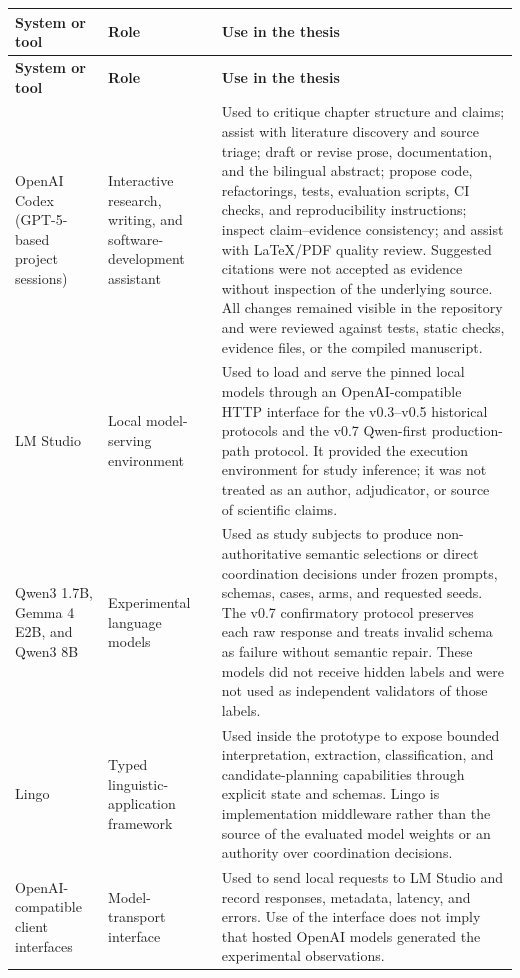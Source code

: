 \begingroup
\setlength{\tabcolsep}{4pt}
\begin{longtable}{>{\raggedright\arraybackslash}p{}>{\raggedright\arraybackslash}p{}>{\raggedright\arraybackslash}p{}}
\toprule
\textbf{System or tool} & \textbf{Role} & \textbf{Use in the thesis} \\
\midrule
\endfirsthead
\toprule
\textbf{System or tool} & \textbf{Role} & \textbf{Use in the thesis} \\
\midrule
\endhead
OpenAI Codex (GPT-5-based project sessions) & Interactive research, writing, and software-development assistant & Used to critique chapter structure and claims; assist with literature discovery and source triage; draft or revise prose, documentation, and the bilingual abstract; propose code, refactorings, tests, evaluation scripts, CI checks, and reproducibility instructions; inspect claim--evidence consistency; and assist with LaTeX/PDF quality review. Suggested citations were not accepted as evidence without inspection of the underlying source. All changes remained visible in the repository and were reviewed against tests, static checks, evidence files, or the compiled manuscript. \\
LM Studio & Local model-serving environment & Used to load and serve the pinned local models through an OpenAI-compatible HTTP interface for the v0.3--v0.5 historical protocols and the v0.7 Qwen-first production-path protocol. It provided the execution environment for study inference; it was not treated as an author, adjudicator, or source of scientific claims. \\
Qwen3 1.7B, Gemma 4 E2B, and Qwen3 8B & Experimental language models & Used as study subjects to produce non-authoritative semantic selections or direct coordination decisions under frozen prompts, schemas, cases, arms, and requested seeds. The v0.7 confirmatory protocol preserves each raw response and treats invalid schema as failure without semantic repair. These models did not receive hidden labels and were not used as independent validators of those labels. \\
Lingo & Typed linguistic-application framework & Used inside the prototype to expose bounded interpretation, extraction, classification, and candidate-planning capabilities through explicit state and schemas. Lingo is implementation middleware rather than the source of the evaluated model weights or an authority over coordination decisions. \\
OpenAI-compatible client interfaces & Model-transport interface & Used to send local requests to LM Studio and record responses, metadata, latency, and errors. Use of the interface does not imply that hosted OpenAI models generated the experimental observations. \\
\bottomrule
\end{longtable}
\endgroup

